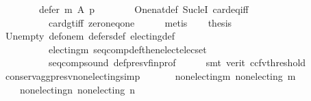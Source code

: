 \begin{isabellebody}
\ \ \ \ \ \ \ \ defer\ m{}\ A\ p\ {\isasymnoteq}\ {\isacharbraceleft}{\kern0pt}{\isacharbraceright}{\kern0pt}{\isachardoublequoteclose}\isanewline
\ \ \ \ \isamarkupfalse%
\ One{\isacharunderscore}{\kern0pt}nat{\isacharunderscore}{\kern0pt}def\ Suc{\isacharunderscore}{\kern0pt}leI\ card{\isacharunderscore}{\kern0pt}eq{\isacharunderscore}{\kern0pt}{}{\isacharunderscore}{\kern0pt}iff\isanewline
\ \ \ \ \ \ \ \ \ \ card{\isacharunderscore}{\kern0pt}gt{\isacharunderscore}{\kern0pt}{}{\isacharunderscore}{\kern0pt}iff\ zero{\isacharunderscore}{\kern0pt}neq{\isacharunderscore}{\kern0pt}one\isanewline
\ \ \ \ \isamarkupfalse%
\ metis\isanewline
\ \ \isamarkupfalse%
\ {\isacharquery}{\kern0pt}thesis\isanewline
\ \ \ \ \isamarkupfalse%
\ Un{\isacharunderscore}{\kern0pt}empty\ def{\isacharunderscore}{\kern0pt}one{\isacharunderscore}{\kern0pt}m{}\ defers{\isacharunderscore}{\kern0pt}def\ electing{\isacharunderscore}{\kern0pt}def\isanewline
\ \ \ \ \ \ \ \ \ \ electing{\isacharunderscore}{\kern0pt}m{}\ seq{\isacharunderscore}{\kern0pt}comp{\isacharunderscore}{\kern0pt}def{\isacharunderscore}{\kern0pt}then{\isacharunderscore}{\kern0pt}elect{\isacharunderscore}{\kern0pt}elec{\isacharunderscore}{\kern0pt}set\isanewline
\ \ \ \ \ \ \ \ \ \ seq{\isacharunderscore}{\kern0pt}comp{\isacharunderscore}{\kern0pt}sound\ def{\isacharunderscore}{\kern0pt}presv{\isacharunderscore}{\kern0pt}fin{\isacharunderscore}{\kern0pt}prof\isanewline
\ \ \ \ \isamarkupfalse%
\ {\isacharparenleft}{\kern0pt}smt\ {\isacharparenleft}{\kern0pt}verit{\isacharcomma}{\kern0pt}\ ccfv{\isacharunderscore}{\kern0pt}threshold{\isacharparenright}{\kern0pt}{\isacharparenright}{\kern0pt}\isanewline
{}\isamarkupfalse%
%
\endisatagproof
{\isafoldproof}%
%
\isadelimproof
\isanewline
%
\endisadelimproof
\isanewline
\isanewline
{}\isamarkupfalse%
\ conserv{\isacharunderscore}{\kern0pt}agg{\isacharunderscore}{\kern0pt}presv{\isacharunderscore}{\kern0pt}non{\isacharunderscore}{\kern0pt}electing{\isacharbrackleft}{\kern0pt}simp{\isacharbrackright}{\kern0pt}{\isacharcolon}{\kern0pt}\isanewline
\ \ \isanewline
\ \ \ \ non{\isacharunderscore}{\kern0pt}electing{\isacharunderscore}{\kern0pt}m{\isacharcolon}{\kern0pt}\ {\isachardoublequoteopen}non{\isacharunderscore}{\kern0pt}electing\ m{\isachardoublequoteclose}\ \isanewline
\ \ \ \ non{\isacharunderscore}{\kern0pt}electing{\isacharunderscore}{\kern0pt}n{\isacharcolon}{\kern0pt}\ {\isachardoublequoteopen}non{\isacharunderscore}{\kern0pt}electing\ n{\isachardoublequoteclose}\ \isanewline

\end{isabellebody}
